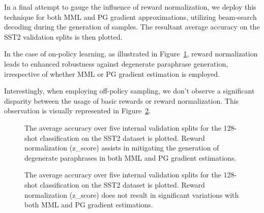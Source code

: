 \documentclass[11pt]{article}
\begin{document}
In a final attempt to gauge the influence of reward normalization, we deploy this technique for both MML and PG gradient approximations, utilizing beam-search decoding during the generation of samples. The resultant average accuracy on the SST2 validation splits is then plotted.

In the case of on-policy learning, as illustrated in Figure~\ref{zscore-on-policy}, reward normalization leads to enhanced robustness against degenerate paraphrase generation, irrespective of whether MML or PG gradient estimation is employed.

Interestingly, when employing off-policy sampling, we don't observe a significant disparity between the usage of basic rewards or reward normalization. This observation is visually represented in Figure~\ref{zscore-off-policy}.

\begin{figure}[h]
\begin{center}

\end{center}
\caption{The average accuracy over five internal validation splits for the 128-shot classification on the SST2 dataset is plotted. Reward normalization (z\_score) assists in mitigating the generation of degenerate paraphrases in both MML and PG gradient estimations.}
\label{zscore-on-policy}
\end{figure}

\begin{figure}[h]
\begin{center}

\end{center}
\caption{The average accuracy over five internal validation splits for the 128-shot classification on the SST2 dataset is plotted. Reward normalization (z\_score) does not result in significant variations with both MML and PG gradient estimations.}
\label{zscore-off-policy}
\end{figure}
\end{document}
